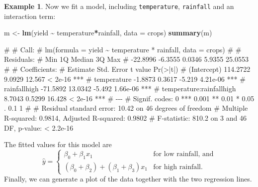 \documentclass[
  a4paper,
]{article}
\newenvironment{Shaded}{\begin{snugshade}}{\end{snugshade}}
\newcommand{\AttributeTok}[1]{\textcolor[rgb]{0.13,0.29,0.53}{#1}}
\newcommand{\FunctionTok}[1]{\textcolor[rgb]{0.13,0.29,0.53}{\textbf{#1}}}
\newcommand{\NormalTok}[1]{#1}
\newcommand{\OtherTok}[1]{\textcolor[rgb]{0.56,0.35,0.01}{#1}}
\newcommand{\SpecialCharTok}[1]{\textcolor[rgb]{0.81,0.36,0.00}{\textbf{#1}}}
\theoremstyle{definition}
\theoremstyle{definition}
\newtheorem{example}{Example}[section]
\theoremstyle{definition}
\theoremstyle{definition}
\theoremstyle{remark}
\begin{document}
\begin{example}
Now we fit a model, including \texttt{temperature}, \texttt{rainfall} and
an interaction term:

\begin{Shaded}
\begin{Highlighting}[]
\NormalTok{m }\OtherTok{\textless{}{-}} \FunctionTok{lm}\NormalTok{(yield }\SpecialCharTok{\textasciitilde{}}\NormalTok{ temperature}\SpecialCharTok{*}\NormalTok{rainfall, }\AttributeTok{data =}\NormalTok{ crops)}
\FunctionTok{summary}\NormalTok{(m)}
\end{Highlighting}
\end{Shaded}

\begin{Shaded}
\begin{Highlighting}[]
\NormalTok{\# }
\NormalTok{\# Call:}
\NormalTok{\# lm(formula = yield \textasciitilde{} temperature * rainfall, data = crops)}
\NormalTok{\# }
\NormalTok{\# Residuals:}
\NormalTok{\#      Min       1Q   Median       3Q      Max }
\NormalTok{\# {-}22.8996  {-}6.3555   0.0346   5.9355  25.0553 }
\NormalTok{\# }
\NormalTok{\# Coefficients:}
\NormalTok{\#                          Estimate Std. Error t value Pr(\textgreater{}|t|)    }
\NormalTok{\# (Intercept)              114.2722     9.0929  12.567  \textless{} 2e{-}16 ***}
\NormalTok{\# temperature               {-}1.8873     0.3617  {-}5.219 4.21e{-}06 ***}
\NormalTok{\# rainfallhigh             {-}71.5892    13.0342  {-}5.492 1.66e{-}06 ***}
\NormalTok{\# temperature:rainfallhigh   8.7043     0.5299  16.428  \textless{} 2e{-}16 ***}
\NormalTok{\# {-}{-}{-}}
\NormalTok{\# Signif. codes:  0 \textquotesingle{}***\textquotesingle{} 0.001 \textquotesingle{}**\textquotesingle{} 0.01 \textquotesingle{}*\textquotesingle{} 0.05 \textquotesingle{}.\textquotesingle{} 0.1 \textquotesingle{} \textquotesingle{} 1}
\NormalTok{\# }
\NormalTok{\# Residual standard error: 10.42 on 46 degrees of freedom}
\NormalTok{\# Multiple R{-}squared:  0.9814,  Adjusted R{-}squared:  0.9802 }
\NormalTok{\# F{-}statistic: 810.2 on 3 and 46 DF,  p{-}value: \textless{} 2.2e{-}16}
\end{Highlighting}
\end{Shaded}

The fitted values for this model are
\begin{equation*}
  \hat y
  = \begin{cases}
    \beta_0 + \beta_1 x_1 & \mbox{for low rainfall, and} \\
    (\beta_0 + \beta_2) + (\beta_1 + \beta_3) x_1 & \mbox{for high rainfall}.
  \end{cases}
\end{equation*}
Finally, we can generate a plot of the data together
with the two regression lines.


\end{example}
\end{document}

